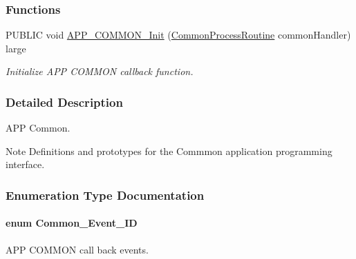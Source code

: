 \subsubsection*{Functions}
\begin{DoxyCompactItemize}
\item 
P\+U\+B\+L\+IC void \hyperlink{group___a_p_p___c_o_m_m_o_n_ga34a79b8f4c3536771fa2b56feea5b48a}{A\+P\+P\+\_\+\+C\+O\+M\+M\+O\+N\+\_\+\+Init} (\hyperlink{group___a_p_p___c_o_m_m_o_n_ga58f116b4ac26c79c46d02a421f516d8c}{Common\+Process\+Routine} common\+Handler) large
\begin{DoxyCompactList}\small\item\em Initialize A\+PP C\+O\+M\+M\+ON callback function. \end{DoxyCompactList}\end{DoxyCompactItemize}


\subsubsection{Detailed Description}
A\+PP Common. 

\begin{DoxyNote}{Note}
Definitions and prototypes for the Commmon application programming interface. 
\end{DoxyNote}


\subsubsection{Enumeration Type Documentation}
\paragraph[{\texorpdfstring{Common\+\_\+\+Event\+\_\+\+ID}{Common_Event_ID}}]{\setlength{\rightskip}{0pt plus 5cm}enum {\bf Common\+\_\+\+Event\+\_\+\+ID}}\hypertarget{group___a_p_p___c_o_m_m_o_n_gac766f0efda77d92351cdb26d5b2c0731}{}\label{group___a_p_p___c_o_m_m_o_n_gac766f0efda77d92351cdb26d5b2c0731}


A\+PP C\+O\+M\+M\+ON call back events. 

